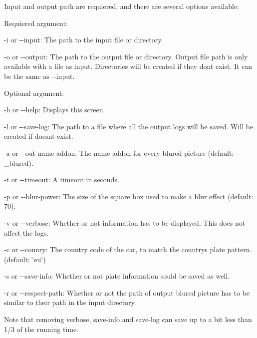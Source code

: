 Input and output path are requiered, and there are several options available\+:

Requiered argument\+:


\begin{DoxyItemize}
\item {\ttfamily -\/i} or {\ttfamily -\/-\/input}\+: The path to the input file or directory.
\item {\ttfamily -\/o} or {\ttfamily -\/-\/output}\+: The path to the output file or directory. Output file path is only available with a file as input. Directories will be created if they don\textquotesingle{}t exist. It can be the same as {\ttfamily -\/-\/input}.
\end{DoxyItemize}

Optional argument\+:


\begin{DoxyItemize}
\item {\ttfamily -\/h} or {\ttfamily -\/-\/help}\+: Displays this screen.
\item {\ttfamily -\/l} or {\ttfamily -\/-\/save-\/log}\+: The path to a file where all the output logs will be saved. Will be created if doesn\textquotesingle{}t exist.
\item {\ttfamily -\/a} or {\ttfamily -\/-\/out-\/name-\/addon}\+: The name addon for every blured picture (default\+: \textquotesingle{}\+\_\+blured\textquotesingle{}).
\item {\ttfamily -\/t} or {\ttfamily -\/-\/timeout}\+: A timeout in seconds.
\item {\ttfamily -\/p} or {\ttfamily -\/-\/blur-\/power}\+: The size of the square box used to make a blur effect (default\+: 70).
\item {\ttfamily -\/v} or {\ttfamily -\/-\/verbose}\+: Whether or not information has to be displayed. This does not affect the logs.
\item {\ttfamily -\/c} or {\ttfamily -\/-\/counry}\+: The country code of the car, to match the country\textquotesingle{}s plate pattern. (default\+: \char`\"{}eu\char`\"{})
\item {\ttfamily -\/s} or {\ttfamily -\/-\/save-\/info}\+: Whether or not plate information sould be saved as well.
\item {\ttfamily -\/r} or {\ttfamily -\/-\/respect-\/path}\+: Whether or not the path of output blured picture has to be similar to their path in the input directory.
\end{DoxyItemize}

Note that removing verbose, save-\/info and save-\/log can save up to a bit less than 1/3 of the running time.

